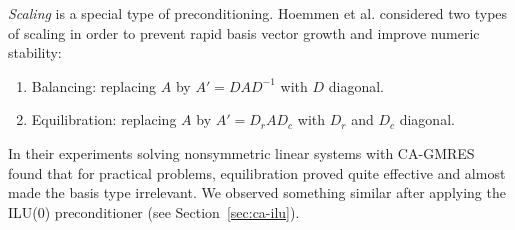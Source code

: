 \documentclass{scrartcl}
\numberwithin{equation}{section}
\begin{document}
\textit{Scaling} is a special type of preconditioning. Hoemmen et al. \cite{Hoemmen:2010:CKS:1970638} considered two types of scaling in order to prevent rapid basis vector growth and improve numeric stability:
\begin{enumerate}
\item Balancing: replacing $A$ by $A' = DAD^{-1}$ with $D$ diagonal.
\item Equilibration: replacing $A$ by $A' = D_rAD_c$ with $D_r$ and $D_c$ diagonal.
\end{enumerate}
In their experiments solving nonsymmetric linear systems with CA-GMRES \cite{Hoemmen:2010:CKS:1970638} found that for practical problems, equilibration proved quite effective and almost made the basis type irrelevant. We observed something similar after applying the ILU(0) preconditioner (see Section~\ref{sec:ca-ilu}).
\end{document}
